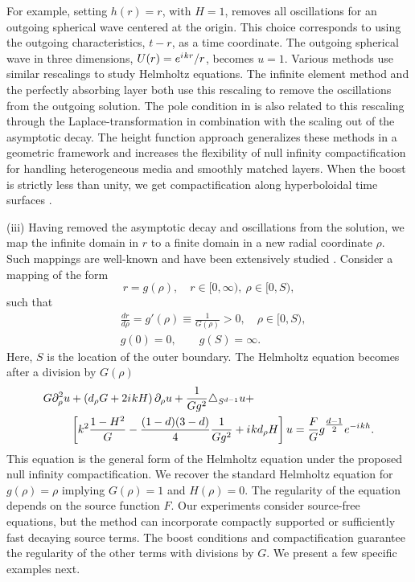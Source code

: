 \documentclass[final,onefignum,onetabnum]{siamart190516}
\newcommand{\iu}{{i\mkern1mu}}
\begin{document}
For example, setting $h(r)=r$, with $H=1$, removes all oscillations for an outgoing spherical wave centered at the origin. This choice corresponds to using the outgoing characteristics, $t-r$, as a time coordinate. The outgoing spherical wave in three dimensions, $U(r)=e^{\iu k r}/r$, becomes $u=1$. Various methods use similar rescalings to study Helmholtz equations. The infinite element method \cite{demkowicz2006few} and the perfectly absorbing layer \cite{wang2017perfect, yang2021truly} both use this rescaling to remove the oscillations from the outgoing solution. The pole condition in \cite{schmidt2008pole} is also related to this rescaling through the Laplace-transformation in combination with the scaling out of the asymptotic decay. The height function approach generalizes these methods in a geometric framework and increases the flexibility of null infinity compactification for handling heterogeneous media and smoothly matched layers. When the boost is strictly less than unity, we get compactification along hyperboloidal time surfaces \cite{Zenginoglu08}. 

(iii) Having removed the asymptotic decay and oscillations from the solution, we map the infinite domain in $r$ to a finite domain in a new radial coordinate $\rho$. Such mappings are well-known and have been extensively studied \cite{GroschOrszag77, boyd1982optimization, shen2009some, wang2017perfect}. Consider a mapping of the form
\[ r = g(\rho), \quad r\in[0,\infty),\ \rho\in[0,S), \]
such that
\begin{align*}
	 & \frac{dr}{d\rho} = g'(\rho) \equiv \frac{1}{G(\rho)} > 0, \quad \rho\in [0,S), \\
	 & g(0)      = 0, \qquad g(S) = \infty.
\end{align*}
Here, $S$ is the location of the outer boundary. The Helmholtz equation becomes after a division by $G(\rho)$
\begin{align}
	\label{eq:hyp_general}
	G \partial_\rho^2 u & + \left( d_\rho G + 2 \iu k H \right) \partial_\rho u + \frac{1}{G g^2}\triangle_{S^{d-1}} u +  \nonumber                        \\
	               & \left[k^2 \frac{1-H^2}{G} - \frac{(1-d)(3-d)}{4} \frac{1}{G g^2} + \iu k d_\rho H \right] u = \frac{F}{G} g^{\tfrac{d-1}{2}} e^{-\iu k h}.
\end{align}
This equation is the general form of the Helmholtz equation under the proposed null infinity compactification. We recover the standard Helmholtz equation for $g(\rho) = \rho$ implying $G(\rho)=1$ and $H(\rho)=0$. The regularity of the equation depends on the source function $F$. Our experiments consider source-free equations, but the method can incorporate compactly supported or sufficiently fast decaying source terms. The boost conditions and compactification guarantee the regularity of the other terms with divisions by $G$. We present a few specific examples next.
\end{document}
